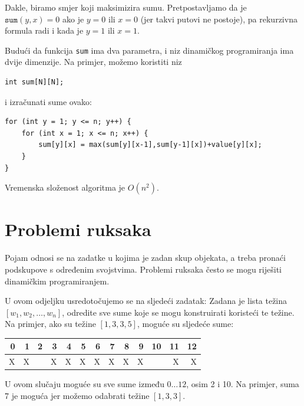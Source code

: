 Dakle, biramo smjer koji maksimizira
sumu.
Pretpostavljamo da je $\texttt{sum}(y,x)=0$
ako je $y=0$ ili $x=0$ (jer takvi putovi ne postoje),
pa rekurzivna formula radi i kada je $y=1$ ili $x=1$.

Budući da funkcija \texttt{sum} ima dva parametra,
i niz dinamičkog programiranja ima dvije dimenzije.
Na primjer, možemo koristiti niz
\begin{lstlisting}
int sum[N][N];
\end{lstlisting}
i izračunati sume ovako:
\begin{lstlisting}
for (int y = 1; y <= n; y++) {
    for (int x = 1; x <= n; x++) {
        sum[y][x] = max(sum[y][x-1],sum[y-1][x])+value[y][x];
    }
}
\end{lstlisting}
Vremenska složenost algoritma je $O(n^2)$.

\section{Problemi ruksaka}


Pojam  odnosi se na zadatke u kojima je
zadan skup objekata, a treba
pronaći podskupove
s određenim svojstvima.
Problemi ruksaka često se mogu riješiti
dinamičkim programiranjem.

U ovom odjeljku usredotočujemo se na sljedeći
zadatak: Zadana je lista težina
$[w_1,w_2,\ldots,w_n]$,
odredite sve
sume koje se mogu konstruirati koristeći te težine.
Na primjer, ako su težine
$[1,3,3,5]$, moguće su sljedeće sume:

\begin{center}
\begin{tabular}{rrrrrrrrrrrrr}
 0 & 1 & 2 & 3 & 4 & 5 & 6 & 7 & 8 & 9 & 10 & 11 & 12 \\
\hline
 X & X & & X & X & X & X & X & X & X & & X & X \\
\end{tabular}
\end{center}

U ovom slučaju moguće su sve sume između $0 \ldots 12$,
osim 2 i 10.
Na primjer, suma 7 je moguća jer
možemo odabrati težine $[1,3,3]$.

